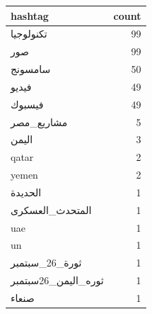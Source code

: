 \begin{tabular}{lr}
\toprule
hashtag & count \\
\midrule
تكنولوجيا & 99 \\
صور & 99 \\
سامسونج & 50 \\
فيديو & 49 \\
فيسبوك & 49 \\
مشاريع\_مصر & 5 \\
اليمن & 3 \\
qatar & 2 \\
yemen & 2 \\
الحديدة & 1 \\
المتحدث\_العسكرى & 1 \\
uae & 1 \\
un & 1 \\
ثورة\_26\_سبتمبر & 1 \\
ثوره\_اليمن\_26سبتمبر & 1 \\
صنعاء & 1 \\
\bottomrule
\end{tabular}
